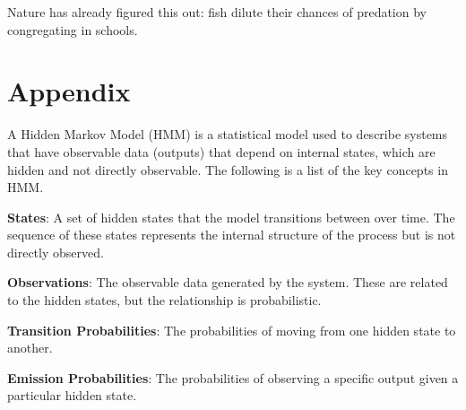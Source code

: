 \documentclass[11pt]{amsart}
\begin{document}
Nature has already figured this out: fish dilute their chances of predation by congregating in schools.
\section*{Appendix}

A Hidden Markov Model (HMM) is a statistical model used to describe systems that have observable data (outputs) that depend on internal states, which are hidden and not directly observable.
The following is a list of the key concepts in HMM.

\textbf{States}: A set of hidden states that the model transitions between over time.
The sequence of these states represents the internal structure of the process but is not directly observed.


\textbf{Observations}: The observable data generated by the system.
These are related to the hidden states, but the relationship is probabilistic.


\textbf{Transition Probabilities}: The probabilities of moving from one hidden state to another.


\textbf{Emission Probabilities}: The probabilities of observing a specific output given a particular hidden state.

\end{document}
